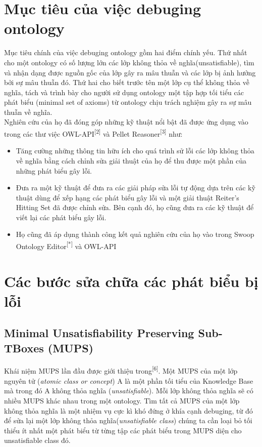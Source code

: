 \section{Mục tiêu của việc debuging ontology}
Mục tiêu chính của việc debuging ontology gồm hai điểm chính yếu. Thứ nhất cho một ontology có số lượng lớn các lớp không thỏa về nghĩa(unsatisfiable), tìm và nhận dạng được nguồn gốc của lớp gây ra mâu thuẫn và các lớp bị ảnh hưởng bởi sự mâu thuẫn đó. Thứ hai cho biết trước tên một lớp cụ thể không thỏa về nghĩa, tách và trình bày cho người sử dụng ontology một tập hợp tối tiểu các phát biểu (minimal set of axioms) từ ontology chịu trách nghiệm gây ra sự mâu thuẫn về nghĩa.
\\
Nghiên cứu của họ đã đóng góp những kỹ thuật nổi bật đã được ứng dụng vào trong các thư việc OWL-API\textsuperscript{[2]} và Pellet Reasoner\textsuperscript{[3]} như:
\begin{itemize}
\item
Tăng cường những thông tin hữu ích cho quá trình sử lỗi các lớp không thỏa về nghĩa bằng cách chỉnh sửa giải thuật của họ để thu được một phần của những phát biểu gây lỗi.
\item
Đưa ra một kỹ thuật để đưa ra các giải pháp sửa lỗi tự động dựa trên các kỹ thuật dùng để xếp hạng các phát biểu gây lỗi và một giải thuật Reiter's Hitting Set đã được chỉnh sửa. Bên cạnh đó, họ cũng đưa ra các kỹ thuật để viết lại các phát biểu gây lỗi.
\item
Họ cũng đã áp dụng thành công kết quả nghiên cứu của họ vào trong Swoop Ontology Editor\textsuperscript{[*]} và OWL-API
\end{itemize}
\section{Các bước sửa chữa các phát biểu bị lỗi}

\subsection{Minimal Unsatisfiability Preserving Sub-TBoxes (MUPS)}
Khái niệm MUPS lần đầu được giới thiệu trong\textsuperscript{[6]}. Một MUPS của một lớp nguyên tử (\textit{atomic class or concept}) A là một phần tối tiểu của Knowledge Base mà trong đó A không thỏa nghĩa (\textit{unsatisfiable}). Mỗi lớp không thỏa nghĩa sẽ có nhiều MUPS khác nhau trong một ontology. Tìm tất cả MUPS của một lớp không thỏa nghĩa là một nhiệm vụ cực kì khó đứng ở khía cạnh debuging, từ đó để sửa lại một lớp không thỏa nghĩa(\textit{unsatisfiable class}) chúng ta cần loại bỏ tối thiểu ít nhất một phát biểu từ từng tập các phát biểu trong MUPS diện cho unsatisfiable class đó.

